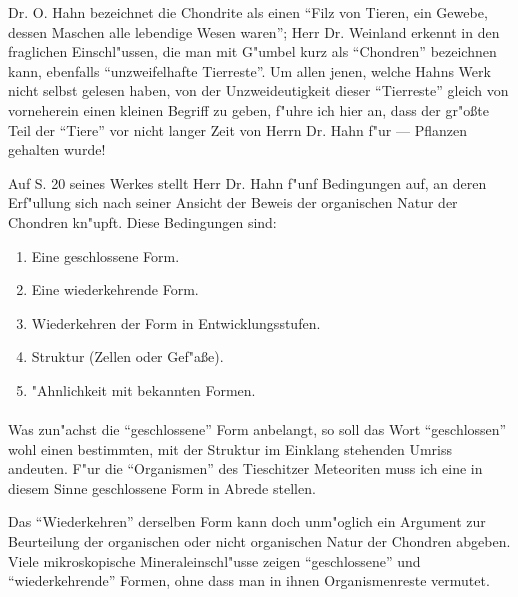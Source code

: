 \documentclass[a4paper, 12pt, oneside]{article}
\begin{document}
Dr. O. Hahn bezeichnet die Chondrite als einen "`Filz von Tieren, ein Gewebe, dessen Maschen alle lebendige Wesen waren"'; Herr Dr. Weinland erkennt in den fraglichen Einschl"ussen, die man mit G"umbel kurz als "`Chondren"' bezeichnen kann, ebenfalls "`unzweifelhafte Tierreste"'. Um allen jenen, welche Hahns Werk nicht selbst gelesen haben, von der Unzweideutigkeit dieser "`Tierreste"' gleich von vorneherein einen kleinen Begriff zu geben, f"uhre ich hier an, dass der gr"oßte Teil der "`Tiere"' vor nicht langer Zeit von Herrn Dr. Hahn f"ur — Pflanzen gehalten wurde!

Auf S. 20 seines Werkes stellt Herr Dr. Hahn f"unf Bedingungen auf, an deren Erf"ullung sich nach seiner Ansicht der Beweis der organischen Natur der Chondren kn"upft. Diese Bedingungen sind:
\begin{enumerate}
    \item Eine geschlossene Form.
    \item Eine wiederkehrende Form.
    \item Wiederkehren der Form in Entwicklungsstufen.
    \item Struktur (Zellen oder Gef"aße).
    \item "Ahnlichkeit mit bekannten Formen.
\end{enumerate}
\paragraph{}
Was zun"achst die "`geschlossene"' Form anbelangt, so soll das Wort "`geschlossen"' wohl einen bestimmten, mit der Struktur im Einklang stehenden Umriss andeuten. F"ur die "`Organismen"' des Tieschitzer Meteoriten muss ich eine in diesem Sinne geschlossene Form in Abrede stellen.

Das "`Wiederkehren"' derselben Form kann doch unm"oglich ein Argument zur Beurteilung der organischen oder nicht organischen Natur der Chondren abgeben. Viele mikroskopische Mineraleinschl"usse zeigen "`geschlossene"' und "`wiederkehrende"' Formen, ohne dass man in ihnen Organismenreste vermutet.
\end{document}
